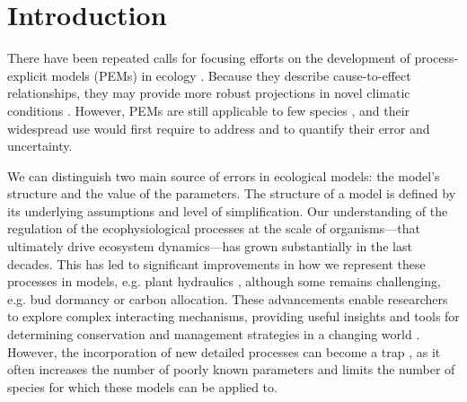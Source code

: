 \documentclass[preprint,12pt,authoryear]{elsarticle}
\begin{document}
\linenumbers

\clearpage
\section{Introduction}

There have been repeated calls for focusing efforts on the development of process-explicit models (PEMs) in ecology \citep{Urban2016, Singer2016, Pilowsky2022}. Because they describe cause-to-effect relationships, they may provide more robust projections in novel climatic conditions \citep{VanderMeersch2024}. However, PEMs are still applicable to few species \citep{Evans2016}, and their widespread use would first require to address and to quantify their error and uncertainty.

We can distinguish two main source of errors in ecological models: the model's structure and the value of the parameters. The structure of a model is defined by its underlying assumptions and level of simplification. Our understanding of the regulation of the ecophysiological processes at the scale of organisms---that ultimately drive  ecosystem dynamics---has grown substantially in the last decades. This has led to significant improvements in how we represent these processes in models, e.g. plant hydraulics \citep{Ruffault2022} , although some remains challenging, e.g. bud dormancy \citep{Chuine2016} or carbon allocation. 
These advancements enable researchers to explore complex interacting mechanisms, providing useful insights and tools for determining conservation and management strategies in a changing world \citep{Urban2016}. However, the incorporation of new detailed processes can become a trap \citep{Franklin2020}, as it often increases the number of poorly known parameters and limits the number of species for which these models can be applied to. %
\end{document}
